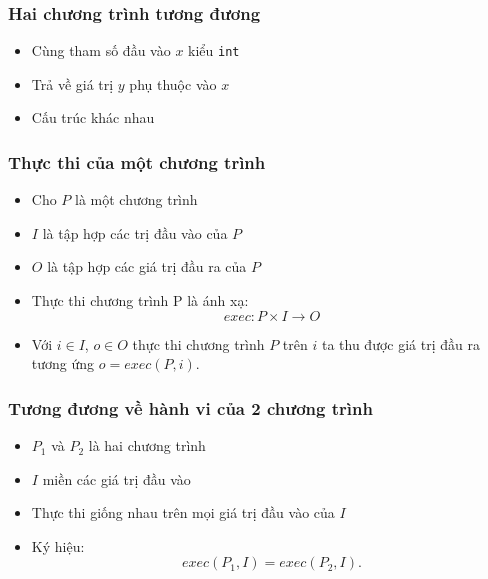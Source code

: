 \documentclass{beamer}
\begin{document}
\begin{frame}
  \frametitle{Hai chương trình tương đương}
  \begin{minipage}[t]{0.48\linewidth}
    
  \end{minipage}
  \hfill
  \begin{minipage}[t]{0.48\linewidth}
    
  \end{minipage}
  \begin{itemize}
  \item Cùng tham số đầu vào $ x $ kiểu \texttt{int}
  \item Trả về giá trị $ y $ phụ thuộc vào $ x $
  \item Cấu trúc khác nhau
  \end{itemize}
\end{frame}


\begin{frame}
  \frametitle{Thực thi của một chương trình}
  \begin{itemize}
  	\item Cho $P$ là một chương trình
  	\item $I$ là tập hợp các trị đầu vào của $P$
  	\item $O$ là tập hợp các giá trị đầu ra của $P$
  	\item Thực thi chương trình	P là ánh xạ: 
  	\[exec: P \times I \rightarrow O\]
  	\item Với $i \in I$, $o \in O$ thực thi chương trình $P$ trên
  	$i$ ta thu được giá trị đầu ra tương ứng $o = exec(P, i)$.
  \end{itemize}  
\end{frame}


\begin{frame}
  \frametitle{Tương đương về hành vi của 2 chương trình}
  \begin{itemize}
  	\item $P_{1}$ và $P_{2}$ là hai chương trình 
  	\item $I$ miền các giá trị đầu vào
  	\item Thực thi giống nhau trên mọi giá trị đầu vào của $I$ 
  	\item Ký hiệu: \[exec(P_{1}, I) = exec(P_{2}, I).\]
  \end{itemize}
 
\end{frame}
\end{document}
